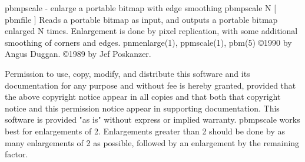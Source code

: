 %

\newpage
%

pbmpscale - enlarge a portable bitmap with edge smoothing
pbmpscale N [ pbmfile ]
Reads a portable bitmap as input, and outputs a portable bitmap
enlarged N times. Enlargement is done by pixel replication,
with some additional smoothing of corners and edges.
pnmenlarge(1), ppmscale(1), pbm(5)
\copyright 1990 by Angus Duggan.
\copyright 1989 by Jef Poskanzer.

Permission to use, copy, modify, and distribute this software and its
documentation for any purpose and without fee is hereby granted, provided
that the above copyright notice appear in all copies and that both that
copyright notice and this permission notice appear in supporting
documentation.  This software is provided "as is" without express or
implied warranty.
pbmpscale works best for enlargements of 2. Enlargements greater than 2
should be done by as many enlargements of 2 as possible, followed by an
enlargement by the remaining factor.
%
 
%

\newpage
%

